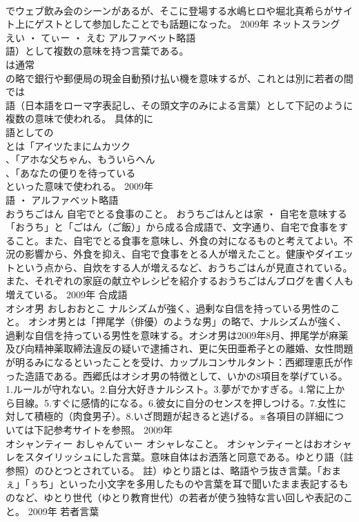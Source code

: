 \documentclass[8pt]{extreport}
\begin{document}
\begin{CJK}{UTF8}{min}
\\	でウェブ飲み会のシーンがあるが、そこに登場する水嶋ヒロや堀北真希らがサイト上にゲストとして参加したことでも話題になった。	2009年	ネットスラング	
\\	えい ・ てぃー ・ えむ	アルファベット略語
\\	語）として複数の意味を持つ言葉である。	
\\	は通常
\\	の略で銀行や郵便局の現金自動預け払い機を意味するが、これとは別に若者の間では
\\	語（日本語をローマ字表記し、その頭文字のみによる言葉）として下記のように複数の意味で使われる。 具体的に
\\	語としての
\\	とは「アイツたまにムカツク
\\	、「アホな父ちゃん、もういらへん
\\	、「あなたの便りを待っている
\\	といった意味で使われる。	2009年	
\\	語 ・ アルファベット略語	
\\	おうちごはん		自宅でとる食事のこと。	おうちごはんとは家 ・ 自宅を意味する「おうち」と「ごはん（ご飯）」から成る合成語で、文字通り、自宅で食事をすること。また、自宅でとる食事を意味し、外食の対になるものと考えてよい。不況の影響から、外食を抑え、自宅で食事をとる人が増えたこと。健康やダイエットという点から、自炊をする人が増えるなど、おうちごはんが見直されている。また、それぞれの家庭の献立やレシピを紹介するおうちごはんブログを書く人も増えている。	2009年	合成語	
\\	オシオ男	おしおおとこ	ナルシズムが強く、過剰な自信を持っている男性のこと。	オシオ男とは「押尾学（俳優）のような男」の略で、ナルシズムが強く、過剰な自信を持っている男性を意味する。オシオ男は2009年8月、押尾学が麻薬及び向精神薬取締法違反の疑いで逮捕され、更に矢田亜希子との離婚、女性問題が明るみになるといったことを受け、カップルコンサルタント：西郷理恵氏が作った造語である。西郷氏はオシオ男の特徴として、いかの8項目を挙げている。1.ルールが守れない。2.自分大好きナルシスト。3.夢がでかすぎる。4.常に上から目線。5.すぐに感情的になる。6.彼女に自分のセンスを押しつける。7.女性に対して積極的（肉食男子）。8.いざ問題が起きると逃げる。※各項目の詳細については下記参考サイトを参照。	2009年	
\\	オシャンティー	おしゃんてぃー	オシャレなこと。	オシャンティーとはおオシャレをスタイリッシュにした言葉。意味自体はお洒落と同意である。ゆとり語（註参照）のひとつとされている。 註）ゆとり語とは、略語やラ抜き言葉。「おまぇ」「ぅち」といった小文字を多用したものや言葉を耳で聞いたまま表記するものなど、ゆとり世代（ゆとり教育世代）の若者が使う独特な言い回しや表記のこと。	2009年	若者言葉	

\end{CJK}
\end{document}
